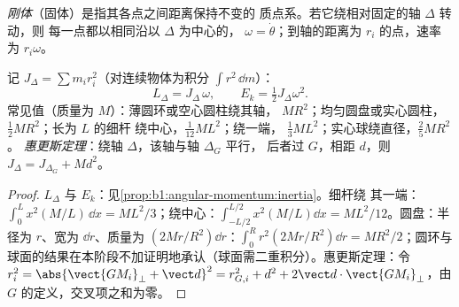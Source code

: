\begin{definition}[固体；绕定轴转动]\label{def:b1:systems-of-points:solid}
\emph{刚体}（固体）是指其各点之间距离保持不变的
质点系。若它绕相对固定的轴 $\Delta$ 转动，则
每一点都以相同沿以 $\Delta$ 为中心的，
$\omega = \dot\theta$；到轴的距离为 $r_i$ 的点，速率为
$r_i\omega$。
\end{definition}

\begin{proposition}\label{prop:b1:systems-of-points:inertia}
记\emph{} $J_\Delta = \sum m_ir_i^2$（对连续物体为积分
$\int r^2\,\dd m$）：
\[
L_\Delta = J_\Delta\,\omega, \qquad E_k = \tfrac12 J_\Delta\omega^2 .
\]
常见值（质量为 $M$）：薄圆环或空心圆柱绕其轴，
$MR^2$；均匀圆盘或实心圆柱，$\tfrac12 MR^2$；长为 $L$ 的细杆
绕中心，$\tfrac{1}{12}ML^2$；绕一端，
$\tfrac13 ML^2$；实心球绕直径，$\tfrac25 MR^2$。
\emph{惠更斯定理}：绕轴 $\Delta$，该轴与轴 $\Delta_G$ 平行，
后者过 $G$，相距 $d$，则 $J_\Delta = J_{\Delta_G} + Md^2$。
\end{proposition}

\begin{proof}
$L_\Delta$ 与 $E_k$：见\cref{prop:b1:angular-momentum:inertia}。细杆绕
其一端：$\int_0^L x^2(M/L)\,\dd x = ML^2/3$；绕中心：$\int_{-L/2}^{L/2}
x^2(M/L)\dd x = ML^2/12$。圆盘：半径为 $r$、宽为 $\dd r$、质量为
$(2Mr/R^2)\dd r$：$\int_0^R r^2(2Mr/R^2)\dd r = MR^2/2$；圆环与
球面的结果在本阶段不加证明地承认（球面需二重积分）。惠更斯定理：令
$r_i^2 = \abs{\vect{GM_i}_\perp + \vect d}^2 = r_{G,i}^2 + d^2 + 2\vect d\cdot
\vect{GM_i}_\perp$，由 $G$ 的定义，交叉项之和为零。
\end{proof}

